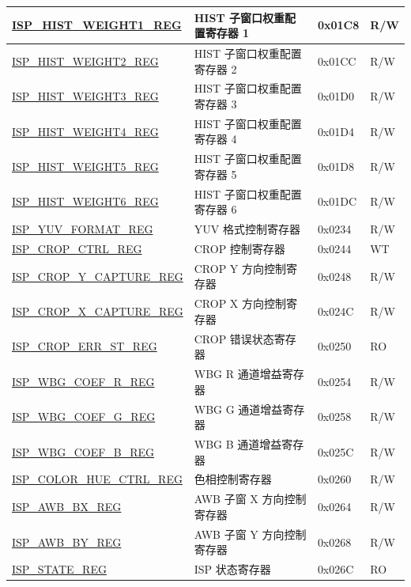 \begin{longtable}{ | p{6cm} | p{7.2cm} | p{1.3cm} | p{1cm} | }
\hyperref[regdesc:ISPHISTWEIGHT1REG]{ISP\_HIST\_WEIGHT1\_REG} & HIST 子窗口权重配置寄存器 1 & 0x01C8 & R/W \\ \hline
\hyperref[regdesc:ISPHISTWEIGHT2REG]{ISP\_HIST\_WEIGHT2\_REG} & HIST 子窗口权重配置寄存器 2 & 0x01CC & R/W \\ \hline
\hyperref[regdesc:ISPHISTWEIGHT3REG]{ISP\_HIST\_WEIGHT3\_REG} & HIST 子窗口权重配置寄存器 3 & 0x01D0 & R/W \\ \hline
\hyperref[regdesc:ISPHISTWEIGHT4REG]{ISP\_HIST\_WEIGHT4\_REG} & HIST 子窗口权重配置寄存器 4 & 0x01D4 & R/W \\ \hline
\hyperref[regdesc:ISPHISTWEIGHT5REG]{ISP\_HIST\_WEIGHT5\_REG} & HIST 子窗口权重配置寄存器 5 & 0x01D8 & R/W \\ \hline
\hyperref[regdesc:ISPHISTWEIGHT6REG]{ISP\_HIST\_WEIGHT6\_REG} & HIST 子窗口权重配置寄存器 6 & 0x01DC & R/W \\ \hline
\hyperref[regdesc:ISPYUVFORMATREG]{ISP\_YUV\_FORMAT\_REG} & YUV 格式控制寄存器 & 0x0234 & R/W \\ \hline
\hyperref[regdesc:ISPCROPCTRLREG]{ISP\_CROP\_CTRL\_REG} & CROP 控制寄存器 & 0x0244 & WT \\ \hline
\hyperref[regdesc:ISPCROPYCAPTUREREG]{ISP\_CROP\_Y\_CAPTURE\_REG} & CROP Y 方向控制寄存器 & 0x0248 & R/W \\ \hline
\hyperref[regdesc:ISPCROPXCAPTUREREG]{ISP\_CROP\_X\_CAPTURE\_REG} & CROP X 方向控制寄存器 & 0x024C & R/W \\ \hline
\hyperref[regdesc:ISPCROPERRSTREG]{ISP\_CROP\_ERR\_ST\_REG} & CROP 错误状态寄存器 & 0x0250 & RO \\ \hline
\hyperref[regdesc:ISPWBGCOEFRREG]{ISP\_WBG\_COEF\_R\_REG} & WBG R 通道增益寄存器 & 0x0254 & R/W \\ \hline
\hyperref[regdesc:ISPWBGCOEFGREG]{ISP\_WBG\_COEF\_G\_REG} & WBG G 通道增益寄存器 & 0x0258 & R/W \\ \hline
\hyperref[regdesc:ISPWBGCOEFBREG]{ISP\_WBG\_COEF\_B\_REG} & WBG B 通道增益寄存器 & 0x025C & R/W \\ \hline
\hyperref[regdesc:ISPCOLORHUECTRLREG]{ISP\_COLOR\_HUE\_CTRL\_REG} & 色相控制寄存器 & 0x0260 & R/W \\ \hline
\hyperref[regdesc:ISPAWBBXREG]{ISP\_AWB\_BX\_REG} & AWB 子窗 X 方向控制寄存器 & 0x0264 & R/W \\ \hline
\hyperref[regdesc:ISPAWBBYREG]{ISP\_AWB\_BY\_REG} & AWB 子窗 Y 方向控制寄存器 & 0x0268 & R/W \\ \hline
\hyperref[regdesc:ISPSTATEREG]{ISP\_STATE\_REG} & ISP 状态寄存器 & 0x026C & RO \\ \hline

\end{longtable}
